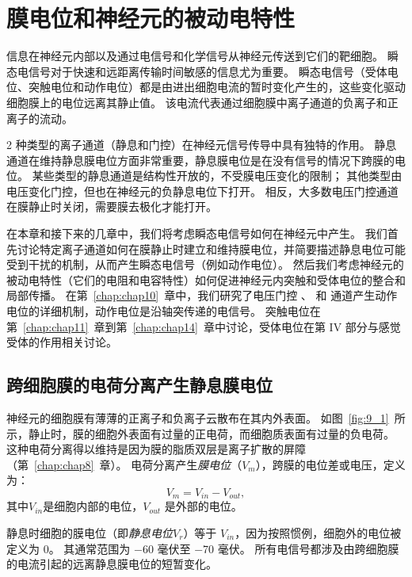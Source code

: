 \chapter{膜电位和神经元的被动电特性} \label{chap:chap9}

信息在神经元内部以及通过电信号和化学信号从神经元传送到它们的靶细胞。
瞬态电信号对于快速和远距离传输时间敏感的信息尤为重要。
瞬态电信号（受体电位、突触电位和动作电位）都是由进出细胞电流的暂时变化产生的，这些变化驱动细胞膜上的电位远离其静止值。
该电流代表通过细胞膜中离子通道的负离子和正离子的流动。


2 种类型的离子通道（静息和门控）在神经元信号传导中具有独特的作用。
静息通道在维持静息膜电位方面非常重要，静息膜电位是在没有信号的情况下跨膜的电位。
某些类型的静息通道是结构性开放的，不受膜电压变化的限制；
其他类型由电压变化门控，但也在神经元的负静息电位下打开。
相反，大多数电压门控通道在膜静止时关闭，需要膜去极化才能打开。


在本章和接下来的几章中，我们将考虑瞬态电信号如何在神经元中产生。
我们首先讨论特定离子通道如何在膜静止时建立和维持膜电位，并简要描述静息电位可能受到干扰的机制，从而产生瞬态电信号（例如动作电位）。
然后我们考虑神经元的被动电特性（它们的电阻和电容特性）如何促进神经元内突触和受体电位的整合和局部传播。
在第~\ref{chap:chap10}~章中，我们研究了电压门控 、 和  通道产生动作电位的详细机制，动作电位是沿轴突传递的电信号。
突触电位在第~\ref{chap:chap11}~章到第~\ref{chap:chap14}~章中讨论，受体电位在第 IV 部分与感觉受体的作用相关讨论。



\section{跨细胞膜的电荷分离产生静息膜电位}

神经元的细胞膜有薄薄的正离子和负离子云散布在其内外表面。
如图~\ref{fig:9_1}~所示，静止时，膜的细胞外表面有过量的正电荷，而细胞质表面有过量的负电荷。
这种电荷分离得以维持是因为膜的脂质双层是离子扩散的屏障（第~\ref{chap:chap8}~章）。
电荷分离产生\textit{膜电位}（$ V_m $），跨膜的电位差或电压，定义为：
\begin{equation}
	V_m = V_{in} - V_{out},
\end{equation}
其中$ V_{in} $是细胞内部的电位，$ V_{out} $ 是外部的电位。


静息时细胞的膜电位（即\textit{静息电位}$ V_r $）等于 $V_{in}$，因为按照惯例，细胞外的电位被定义为 0。
其通常范围为 −60 毫伏至 −70 毫伏。
所有电信号都涉及由跨细胞膜的电流引起的远离静息膜电位的短暂变化。


